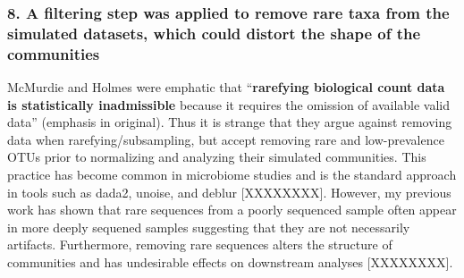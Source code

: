\documentclass[
]{article}
\begin{document}
\hypertarget{a-filtering-step-was-applied-to-remove-rare-taxa-from-the-simulated-datasets-which-could-distort-the-shape-of-the-communities}{%
\subsubsection{8. A filtering step was applied to remove rare taxa from
the simulated datasets, which could distort the shape of the
communities}\label{a-filtering-step-was-applied-to-remove-rare-taxa-from-the-simulated-datasets-which-could-distort-the-shape-of-the-communities}}

McMurdie and Holmes were emphatic that ``\textbf{rarefying biological
count data is statistically inadmissible} because it requires the
omission of available valid data'' (emphasis in original). Thus it is
strange that they argue against removing data when
rarefying/subsampling, but accept removing rare and low-prevalence OTUs
prior to normalizing and analyzing their simulated communities. This
practice has become common in microbiome studies and is the standard
approach in tools such as dada2, unoise, and deblur {[}XXXXXXXX{]}.
However, my previous work has shown that rare sequences from a poorly
sequenced sample often appear in more deeply sequened samples suggesting
that they are not necessarily artifacts. Furthermore, removing rare
sequences alters the structure of communities and has undesirable
effects on downstream analyses {[}XXXXXXXX{]}.
\end{document}
